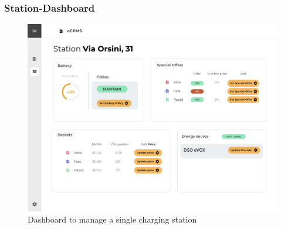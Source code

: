 \subsubsection{Station-Dashboard}
\begin{center}
    \begin{figure}[H]
        \includegraphics[width=\textwidth]{./img/design/web/station.png}
        \caption{Dashboard to manage a single charging station}
    \end{figure}
\end{center}